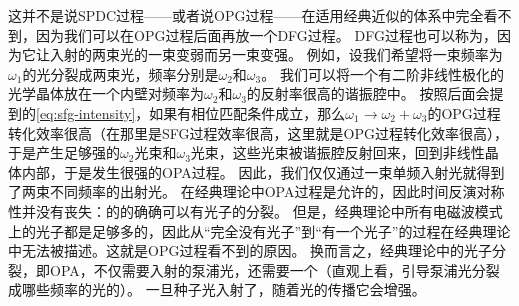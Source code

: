 这并不是说SPDC过程——或者说OPG过程——在适用经典近似的体系中完全看不到，因为我们可以在OPG过程后面再放一个DFG过程。
DFG过程也可以称为，因为它让入射的两束光的一束变弱而另一束变强。
例如，设我们希望将一束频率为$\omega_1$的光分裂成两束光，频率分别是$\omega_2$和$\omega_3$。
我们可以将一个有二阶非线性极化的光学晶体放在一个内壁对频率为$\omega_2$和$\omega_3$的反射率很高的谐振腔中。
按照后面会提到的\eqref{eq:sfg-intensity}，如果有相位匹配条件成立，那么$\omega_1 \to \omega_2 + \omega_3$的OPG过程转化效率很高（在那里是SFG过程效率很高，这里就是OPG过程转化效率很高），于是产生足够强的$\omega_2$光束和$\omega_3$光束，这些光束被谐振腔反射回来，回到非线性晶体内部，于是发生很强的OPA过程。
因此，我们仅仅通过一束单频入射光就得到了两束不同频率的出射光。
在经典理论中OPA过程是允许的，因此时间反演对称性并没有丧失：的的确确可以有光子的分裂。
但是，经典理论中所有电磁波模式上的光子都是足够多的，因此从“完全没有光子”到“有一个光子”的过程在经典理论中无法被描述。这就是OPG过程看不到的原因。
换而言之，经典理论中的光子分裂，即OPA，不仅需要入射的泵浦光，还需要一个（直观上看，引导泵浦光分裂成哪些频率的光的）。
一旦种子光入射了，随着光的传播它会增强。

